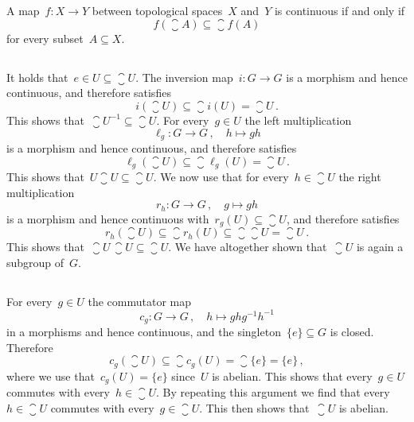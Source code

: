 \section{}


\begin{recall}
  A map~$f \colon X \to Y$ between topological spaces~$X$ and~$Y$ is continuous if and only if
  \[
    f( \closure{A} )
    \subseteq
    \closure{f(A)}
  \]
  for every subset~$A \subseteq X$.
\end{recall}





\subsection{}

It holds that~$e \in U \subseteq \closure{U}$.
The inversion map~$i \colon G \to G$ is a morphism and hence continuous, and therefore satisfies
\[
  i(\closure{U})
  \subseteq
  \closure{ i(U) }
  =
  \closure{U} \,.
\]
This shows that~$\closure{U}^{-1} \subseteq \closure{U}$.
For every~$g \in U$ the left multiplication
\[
  \ell_g
  \colon
  G
  \to
  G \,,
  \quad
  h
  \mapsto
  gh
\]
is a morphism and hence continuous, and therefore satisfies
\[
  \ell_g( \closure{U} )
  \subseteq
  \closure{ \ell_g(U) }
  =
  \closure{U} \,.
\]
This shows that~$U \closure{U} \subseteq \closure{U}$.
We now use that for every~$h \in \closure{U}$ the right multiplication
\[
  r_h
  \colon
  G
  \to
  G \,,
  \quad
  g
  \mapsto
  gh
\]
is a morphism and hence continuous with~$r_g(U) \subseteq \closure{U}$, and therefore satisfies
\[
  r_h( \closure{U} )
  \subseteq
  \closure{ r_h(U) }
  \subseteq
  \closure{\closure{U}} 
  =
  \closure{U} \,.
\]
This shows that~$\closure{U} \, \closure{U} \subseteq \closure{U}$.
We have altogether shown that~$\closure{U}$ is again a subgroup of~$G$.





\subsection{}

For every~$g \in U$ the commutator map
\[
  c_g
  \colon
  G
  \to
  G \,,
  \quad
  h
  \mapsto
  g h g^{-1} h^{-1}
\]
in a morphisms and hence continuous, and the singleton~$\{e\} \subseteq G$ is closed.
Therefore
\[
  c_g(\closure{U})
  \subseteq
  \closure{ c_g(U) }
  =
  \closure{ \{e\} }
  =
  \{e\} \,,
\]
where we use that~$c_g(U) = \{e\}$ since~$U$ is abelian.
This shows that every~$g \in U$ commutes with every~$h \in \closure{U}$.
By repeating this argument we find that every~$h \in \closure{U}$ commutes with every~$g \in \closure{U}$.
This then shows that~$\closure{U}$ is abelian.




